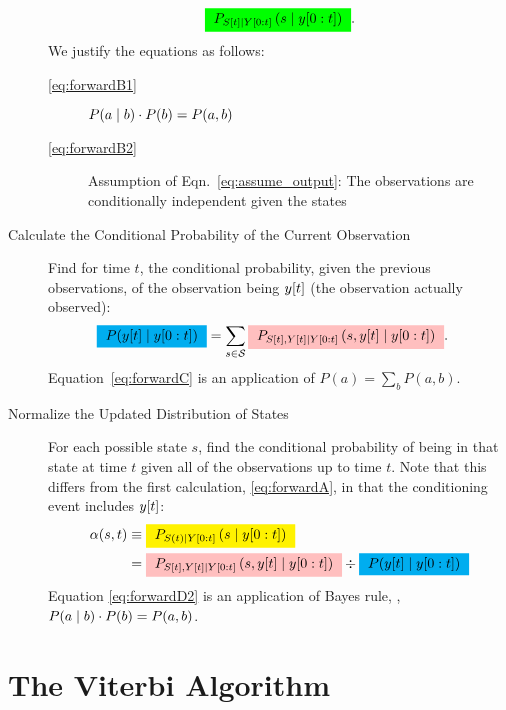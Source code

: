 \begin{description}
\begin{subequations}
\begin{align}
      \prealpha .
    \end{align}
  \end{subequations}
We justify the equations as follows:
\begin{description}
\item[\eqref{eq:forwardB1}]  $P(a\mid b)\cdot P(b) = P(a,b)$
\item[\eqref{eq:forwardB2}] Assumption of
  Eqn.~\eqref{eq:assume_output}: The observations are conditionally
  independent given the states
\end{description}
\item[Calculate the Conditional Probability of the Current Observation]
  Find for time $t$, the conditional probability, given the previous
  observations, of the observation being ${y}{[t]}$ (the observation actually
  observed):
  \begin{align}
    \mlabel{eq:forwardC}
    \gammax &= \sum_{s \in \states} \pregamma .
  \end{align}
Equation~\eqref{eq:forwardC} is an application of $P(a) = \sum_b P(a,b)$.
\item[Normalize the Updated Distribution of States] For each possible
  state $s$, find the conditional probability of being in that state
  at time $t$ given all of the observations up to time $t$.  Note that
  this differs from the first calculation, \eqref{eq:forwardA}, in that
  the conditioning event includes ${y}{[t]}$:%
  \begin{subequations}
    \label{eq:forwardD}
    \begin{align}
      \mlabel{eq:forwardD1}
      \alpha(s,t) &\equiv
      \alphax{t}{s} \\
      \mlabel{eq:forwardD2}
      &= \pregamma \div \gammax
    \end{align}
  \end{subequations}
  Equation \eqref{eq:forwardD2} is an application of Bayes rule, \ie,
  $P(a\mid b)\cdot P(b) = P(a,b)$.
\end{description}

\section{The Viterbi Algorithm}
\label{sec:viterbi}

